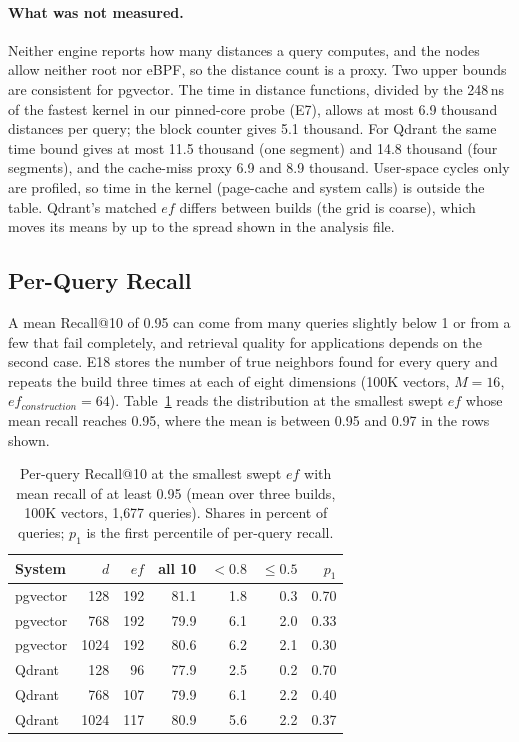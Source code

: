 \documentclass[sigconf, nonacm]{acmart}
\begin{document}
\paragraph{What was not measured.} Neither engine reports how many distances a query computes, and
the nodes allow neither root nor eBPF, so the distance count is a proxy. Two upper bounds are consistent for pgvector. The time in distance
functions, divided by the 248\,ns of the fastest kernel in our pinned-core probe (E7), allows at most 6.9 thousand distances per query;
the block counter gives 5.1 thousand. For Qdrant the same time bound gives at most 11.5 thousand (one segment) and 14.8 thousand
(four segments), and the cache-miss proxy 6.9 and 8.9 thousand. User-space cycles only are profiled, so time in the kernel
(page-cache and system calls) is outside the table. Qdrant's matched $ef$ differs between builds (the grid is coarse), which moves
its means by up to the spread shown in the analysis file.


\subsection{Per-Query Recall}
\label{sec:perquery}

A mean Recall@10 of 0.95 can come from many queries slightly below 1 or from a few that fail
completely, and retrieval quality for applications depends on the second case. E18 stores the
number of true neighbors found for every query and repeats the build three times at each of
eight dimensions (100K vectors, $M=16$, $ef_{construction}=64$). Table~\ref{tab:perquery}
reads the distribution at the smallest swept $ef$ whose mean recall reaches 0.95, where the
mean is between 0.95 and 0.97 in the rows shown.

\begin{table}[t]
  \caption{Per-query Recall@10 at the smallest swept $ef$ with mean recall of at least 0.95
  (mean over three builds, 100K vectors, 1{,}677 queries). Shares in percent of queries;
  $p_1$ is the first percentile of per-query recall.}
  \label{tab:perquery}
  \small
  \begin{tabular}{lr|rrrrr}
    \toprule
    System & $d$ & $ef$ & all 10 & $<0.8$ & $\le 0.5$ & $p_1$ \\
    \midrule
    pgvector & 128 & 192 & 81.1 & 1.8 & 0.3 & 0.70 \\
    pgvector & 768 & 192 & 79.9 & 6.1 & 2.0 & 0.33 \\
    pgvector & 1024 & 192 & 80.6 & 6.2 & 2.1 & 0.30 \\
    \midrule
    Qdrant & 128 & 96 & 77.9 & 2.5 & 0.2 & 0.70 \\
    Qdrant & 768 & 107 & 79.9 & 6.1 & 2.2 & 0.40 \\
    Qdrant & 1024 & 117 & 80.9 & 5.6 & 2.2 & 0.37 \\
    \bottomrule
  \end{tabular}
\end{table}
\end{document}
